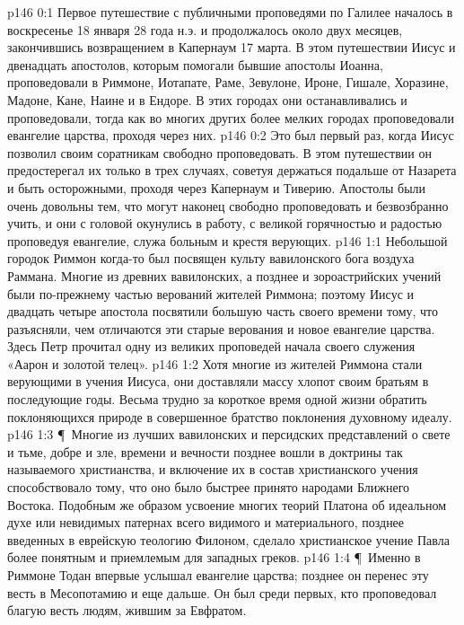 \author{Комиссия срединников}
\vs p146 0:1 Первое путешествие с публичными проповедями по Галилее началось в воскресенье 18 января 28 года н.э. и продолжалось около двух месяцев, закончившись возвращением в Капернаум 17 марта. В этом путешествии Иисус и двенадцать апостолов, которым помогали бывшие апостолы Иоанна, проповедовали в Риммоне, Иотапате, Раме, Зевулоне, Ироне, Гишале, Хоразине, Мадоне, Кане, Наине и в Ендоре. В этих городах они останавливались и проповедовали, тогда как во многих других более мелких городах проповедовали евангелие царства, проходя через них.
\vs p146 0:2 Это был первый раз, когда Иисус позволил своим соратникам свободно проповедовать. В этом путешествии он предостерегал их только в трех случаях, советуя держаться подальше от Назарета и быть осторожными, проходя через Капернаум и Тиверию. Апостолы были очень довольны тем, что могут наконец свободно проповедовать и безвозбранно учить, и они с головой окунулись в работу, с великой горячностью и радостью проповедуя евангелие, служа больным и крестя верующих.
\vs p146 1:1 Небольшой городок Риммон когда\hyp{}то был посвящен культу вавилонского бога воздуха Раммана. Многие из древних вавилонских, а позднее и зороастрийских учений были по\hyp{}прежнему частью верований жителей Риммона; поэтому Иисус и двадцать четыре апостола посвятили большую часть своего времени тому, что разъясняли, чем отличаются эти старые верования и новое евангелие царства. Здесь Петр прочитал одну из великих проповедей начала своего служения «Аарон и золотой телец».
\vs p146 1:2 Хотя многие из жителей Риммона стали верующими в учения Иисуса, они доставляли массу хлопот своим братьям в последующие годы. Весьма трудно за короткое время одной жизни обратить поклоняющихся природе в совершенное братство поклонения духовному идеалу.
\vs p146 1:3 \P\ Многие из лучших вавилонских и персидских представлений о свете и тьме, добре и зле, времени и вечности позднее вошли в доктрины так называемого христианства, и включение их в состав христианского учения способствовало тому, что оно было быстрее принято народами Ближнего Востока. Подобным же образом усвоение многих теорий Платона об идеальном духе или невидимых патернах всего видимого и материального, позднее введенных в еврейскую теологию Филоном, сделало христианское учение Павла более понятным и приемлемым для западных греков.
\vs p146 1:4 \P\ Именно в Риммоне Тодан впервые услышал евангелие царства; позднее он перенес эту весть в Месопотамию и еще дальше. Он был среди первых, кто проповедовал благую весть людям, жившим за Евфратом.
